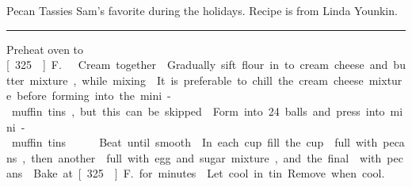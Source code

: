 \begin{recipe}{Pecan Tassies}{}{}
\freeform Sam's favorite during the holidays.  Recipe is from Linda Younkin.\\
\rule{\textwidth}{0.05pt}
\newstep Preheat oven to \unit[325\0]{F.}
Cream together.
Gradually sift flour in to cream cheese and butter mixture, while mixing.
\newstep It is preferable to chill the cream cheese mixture before forming into the mini-muffin tins, but this can be skipped.
\newstep Form into 24 balls and press into mini-muffin tins.
Beat until smooth.
In each cup fill the cup  full with pecans, then another  full with egg and sugar mixture, and the final  with pecans.
\newstep Bake at \unit[325\0]{F.} for \unit[20--25]{minutes}.
\newstep Let cool in tin.  Remove when cool.
\end{recipe}
